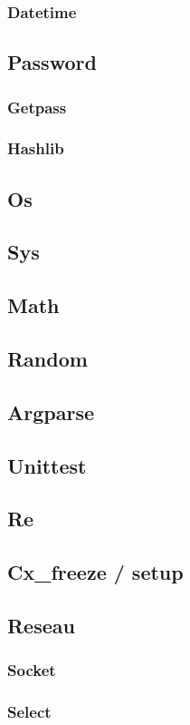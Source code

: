 \documentclass{article}
\begin{document}
\subsubsection{Datetime}
\subsection{Password}
\subsubsection{Getpass}
\subsubsection{Hashlib}
\subsection{Os}
\subsection{Sys}
\subsection{Math}
\subsection{Random}
\subsection{Argparse}
\subsection{Unittest}
\subsection{Re}
\subsection{Cx\_freeze / setup}
\subsection{Reseau}
\subsubsection{Socket}
\subsubsection{Select}
\end{document}
